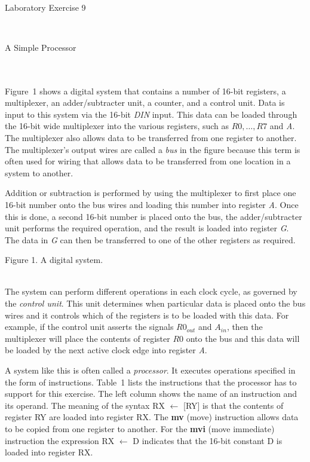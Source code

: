 \documentclass[epsfig,10pt,fullpage]{article}
\begin{document}
~\\
\centerline{\huge Laboratory Exercise 9}
~\\
\centerline{\large A Simple Processor}
~\\
~\\
\noindent
Figure~1 shows a digital system that contains a number of 16-bit registers, a multiplexer, an
adder/subtracter unit, a counter, and a control unit. Data is input to this system via the 16-bit
{\it DIN} input. This data can be loaded through the 16-bit wide multiplexer into the various
registers, such as $R0, \ldots, R7$ and {\it A}. The multiplexer also allows 
data to be transferred from one register to another. The multiplexer's output wires are called 
a {\it bus} in the figure because this term is often used for wiring that allows data to be 
transferred from one location in a system to another.

Addition or subtraction is performed by using the multiplexer to first place one
16-bit number onto the bus wires and loading this number into register {\it A}. Once this
is done, a second 16-bit number is placed onto the bus, the adder/subtracter unit
performs the required operation, and the result is loaded into register {\it G}. The
data in {\it G} can then be transferred to one of the other registers as required.

\begin{figure}[H]
\scriptsize
\centerline{
\hbox{}}
\end{figure}
\centerline{Figure 1.  A digital system.}
~\\
The system can perform different operations in each clock cycle, 
as governed by the {\it control unit}. This unit determines when particular data is 
placed onto the bus wires and it controls which of the registers is to be loaded with this data.
For example, if the control unit asserts the signals 
$R0_{out}$ and $A_{in}$, then the 
multiplexer will place the contents of register $R0$ onto the bus 
and this data will be loaded by the next active clock edge into register {\it A}.

A system like this is often called a {\it processor}. It executes operations specified in
the form of instructions. 
Table~1 lists the instructions that the processor has to support for this exercise.
The left column shows the name of an instruction and its operand. The meaning of the syntax 
RX $\leftarrow$ [RY] is that the contents of register RY are loaded into register RX. 
The {\bf mv} (move) instruction allows data to be copied from one register to another. 
For the {\bf mvi} (move immediate) instruction the expression RX $\leftarrow$ D indicates that the
16-bit constant D is loaded into register RX.
\end{document}
